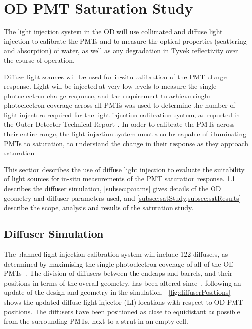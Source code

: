 \documentclass[a4paper,11pt]{article}
\begin{document}
\section{OD PMT Saturation Study}\label{sec:saturation}

The light injection system in the OD will use collimated and diffuse light injection to calibrate the PMTs and to measure the optical properties (scattering and absorption) of water, as well as any degradation in Tyvek reflectivity over the course of operation. 

Diffuse light sources will be used for in-situ calibration of the PMT charge response. Light will be injected at very low levels to measure the single-photoelectron charge response, and the requirement to achieve single-photoelectron coverage across all PMTs was used to determine the number of light injectors required for the light injection calibration system, as reported in the Outer Detector Technical Report~\cite{TN64}. In order to calibrate the PMTs across their entire range, the light injection system must also be capable of illuminating PMTs to saturation, to understand the change in their response as they approach saturation. 

This section describes the use of diffuse light injection to evaluate the suitability of light sources for in-situ measurements of the PMT saturation response. \cref{subsec:LIsim} describes the diffuser simulation, \cref{subsec:params} gives details of the OD geometry and diffuser parameters used, and \cref{subsec:satStudy,subsec:satResults} describe the scope, analysis and results of the saturation study.

\subsection{Diffuser Simulation}\label{subsec:LIsim}

The planned light injection calibration system will include 122 diffusers, as determined by maximising the single-photoelectron coverage of all of the OD PMTs~\cite{TN64}. The division of diffusers between the endcaps and barrels, and their positions in terms of the overall geometry, has been altered since~\cite{TN64}, following an update of the design and geometry in the simulation. ~\cref{fig:diffuserPositions} shows the updated diffuse light injector (LI) locations with respect to OD PMT positions. The diffusers have been positioned as close to equidistant as possible from the surrounding PMTs, next to a strut in an empty cell. 
\end{document}
